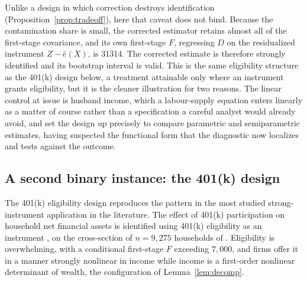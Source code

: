 \documentclass[preprint,11pt,authoryear]{elsarticle}
\theoremstyle{definition}
\begin{document}
Unlike a design in which correction destroys identification
(Proposition~\ref{prop:tradeoff}), here that caveat does not bind. Because the
contamination share is small, the corrected estimator retains almost all of the
first-stage covariance, and its own first-stage $F$, regressing $D$ on the residualized
instrument $Z-\hat e(X)$, is \num{31314}. The corrected estimate is therefore strongly
identified and its bootstrap interval is valid. This is the same eligibility structure
as the 401(k) design below, a treatment attainable only where an instrument grants
eligibility, but it is the cleaner illustration for two reasons. The linear control at
issue is husband income, which a labour-supply equation enters linearly as a matter of
course rather than a specification a careful analyst would already avoid, and
\citet{olson1998} set the design up precisely to compare parametric and semiparametric
estimates, having suspected the functional form that the diagnostic now localizes and
tests against the outcome.

\subsection{A second binary instance: the 401(k) design}\label{sec:401k}

The 401(k) eligibility design reproduces the pattern in the most studied
strong-instrument application in the literature. The effect of 401(k) participation on
household net financial assets is identified using 401(k) eligibility as an
instrument \citep{poterba1995,abadie2003}, on the cross-section of $n=9{,}275$
households of \citet{wooldridge2010}. Eligibility is overwhelming, with a conditional
first-stage $F$ exceeding $7{,}000$, and firms offer it in a manner strongly nonlinear
in income while income is a first-order nonlinear determinant of wealth, the
configuration of Lemma~\ref{lem:decomp}.
\end{document}
